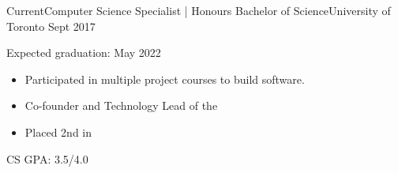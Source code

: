 %
%
%


\begin{experiences}
  \university
    {Current}{Computer Science Specialist | Honours Bachelor of Science}{University of Toronto}
    {Sept 2017} {
                      Expected graduation: May 2022
                      \begin{itemize}
                        \item Participated in multiple project courses to build software.          
                        \item Co-founder and Technology Lead of the            
                        \item Placed 2nd in                                                                 
                      \end{itemize}
                    }
                    {CS GPA: 3.5/4.0}
\end{experiences}
